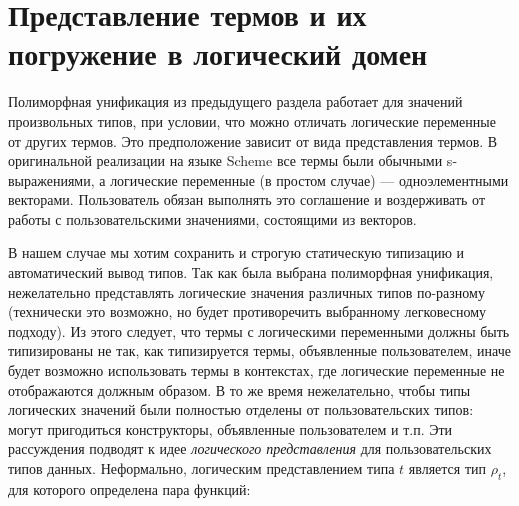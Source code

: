 
\section{Представление термов и их погружение в логический домен}
\label{sec:injection}

Полиморфная унификация из предыдущего раздела работает для значений произвольных типов, при условии, что можно отличать логические переменные от других термов.
Это предположение зависит  от вида представления термов.
В оригинальной реализации на языке Scheme все термы были обычными s-выражениями, а логические переменные (в простом случае) --- одноэлементными векторами.
Пользователь обязан выполнять это соглашение и воздерживать от работы с пользовательскими значениями, состоящими из векторов.


В нашем случае мы хотим сохранить и строгую статическую типизацию и автоматический вывод типов.
Так как была выбрана полиморфная унификация, нежелательно представлять логические значения различных типов по-разному (технически это возможно, но будет противоречить выбранному легковесному подходу). Из этого следует, что термы с логическими переменными должны быть типизированы не так, как типизируется термы, объявленные пользователем, иначе будет возможно использовать термы в контекстах, где логические переменные не отображаются должным образом.
В то же время нежелательно, чтобы типы логических значений были полностью отделены от пользовательских типов: могут пригодиться конструкторы, объявленные пользователем и т.п.
Эти рассуждения подводят к идее \emph{логического представления} для пользовательских типов данных.
Неформально, логическим представлением типа $t$ является тип $\rho_t$, для которого определена пара функций:


